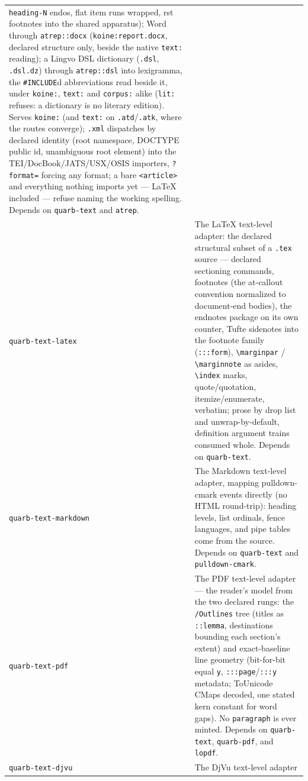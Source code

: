 \documentclass{report}
\begin{document}
\begin{xltabular}{\textwidth}{l X}
  \texttt{heading-N} endos, flat item runs wrapped, rst
  footnotes into the shared apparatus); Word through
  \texttt{atrep::docx} (\texttt{koine:report.docx}, declared
  structure only, beside the native \texttt{text:} reading);
  a Lingvo DSL dictionary (\texttt{.dsl}, \texttt{.dsl.dz})
  through \texttt{atrep::dsl} into lexigramma, the
  \texttt{\#INCLUDE}d abbreviations read beside it, under
  \texttt{koine:}, \texttt{text:} and \texttt{corpus:} alike
  (\texttt{lit:} refuses: a dictionary is no literary
  edition). Serves \texttt{koine:} (and \texttt{text:} on
  \texttt{.atd}/\texttt{.atk}, where the routes converge);
  \texttt{.xml} dispatches by declared identity (root
  namespace, DOCTYPE public id, unambiguous root element) into
  the TEI/DocBook/JATS/USX/OSIS importers, \texttt{?format=}
  forcing any format; a bare \texttt{<article>} and everything
  nothing imports yet — LaTeX included — refuse naming the
  working spelling. Depends on \texttt{quarb-text} and
  \texttt{atrep}. \\
\texttt{quarb-text-latex} & The LaTeX text-level adapter: the declared
  structural subset of a \texttt{.tex} source — declared
  sectioning commands, footnotes (the at-callout convention
  normalized to document-end bodies), the endnotes package on
  its own counter, Tufte sidenotes into the footnote family
  (\texttt{:::form}), \texttt{\textbackslash marginpar} /
  \texttt{\textbackslash marginnote} as asides,
  \texttt{\textbackslash index} marks,
  quote/quotation, itemize/enumerate, verbatim; prose by drop
  list and unwrap-by-default, definition argument trains consumed
  whole. Depends on \texttt{quarb-text}. \\
\texttt{quarb-text-markdown} & The Markdown text-level
  adapter, mapping pulldown-cmark events directly (no HTML
  round-trip): heading levels, list ordinals, fence languages,
  and pipe tables come from the source. Depends on
  \texttt{quarb-text} and \texttt{pulldown-cmark}. \\
\texttt{quarb-text-pdf} & The PDF text-level adapter — the reader's model
  from the two declared rungs: the \texttt{/Outlines} tree
  (titles as \texttt{::lemma}, destinations bounding each
  section's extent) and exact-baseline line geometry
  (bit-for-bit equal \texttt{y}, \texttt{:::page}/\texttt{:::y}
  metadata; ToUnicode CMaps decoded, one stated kern constant for
  word gaps). No \texttt{paragraph} is ever minted. Depends on
  \texttt{quarb-text}, \texttt{quarb-pdf}, and \texttt{lopdf}. \\
\texttt{quarb-text-djvu} & The DjVu text-level adapter

\end{xltabular}
\end{document}
